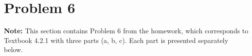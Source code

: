 \clearpage
\section*{Problem 6}

\textbf{Note:} This section contains Problem 6 from the homework, which corresponds to Textbook 4.2.1 with three parts (a, b, c). Each part is presented separately below.
